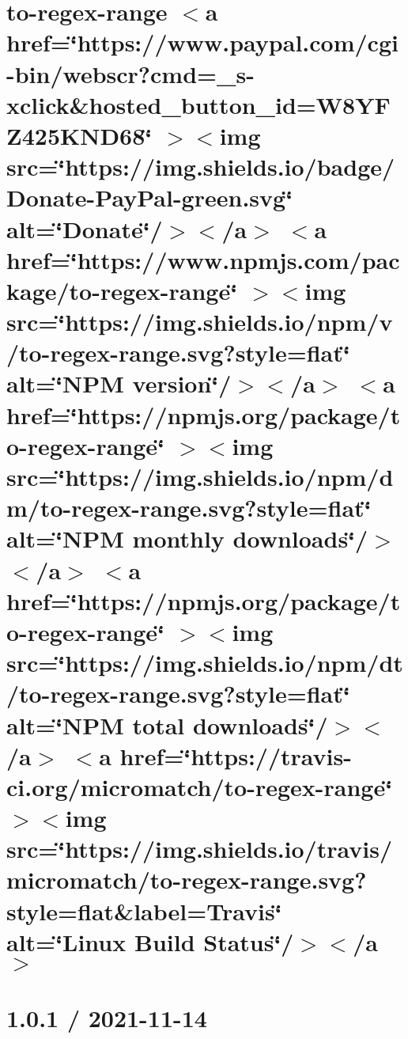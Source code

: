 \documentclass[twoside]{book}
\newcommand{\+}{\discretionary{\mbox{\scriptsize$\hookleftarrow$}}{}{}}
\begin{document}
\chapter{to-\/regex-\/range \texorpdfstring{$<$}{<}a href=\char`\"{}https\+://www.\+paypal.\+com/cgi-\/bin/webscr?cmd=\+\_\+s-\/xclick\&hosted\+\_\+button\+\_\+id=\+W8\+YFZ425\+KND68\char`\"{} \texorpdfstring{$>$}{>}\texorpdfstring{$<$}{<}img src=\char`\"{}https\+://img.\+shields.\+io/badge/\+Donate-\/\+Pay\+Pal-\/green.\+svg\char`\"{} alt=\char`\"{}\+Donate\char`\"{}/\texorpdfstring{$>$}{>}\texorpdfstring{$<$}{<}/a\texorpdfstring{$>$}{>} \texorpdfstring{$<$}{<}a href=\char`\"{}https\+://www.\+npmjs.\+com/package/to-\/regex-\/range\char`\"{} \texorpdfstring{$>$}{>}\texorpdfstring{$<$}{<}img src=\char`\"{}https\+://img.\+shields.\+io/npm/v/to-\/regex-\/range.\+svg?style=flat\char`\"{} alt=\char`\"{}\+NPM version\char`\"{}/\texorpdfstring{$>$}{>}\texorpdfstring{$<$}{<}/a\texorpdfstring{$>$}{>} \texorpdfstring{$<$}{<}a href=\char`\"{}https\+://npmjs.\+org/package/to-\/regex-\/range\char`\"{} \texorpdfstring{$>$}{>}\texorpdfstring{$<$}{<}img src=\char`\"{}https\+://img.\+shields.\+io/npm/dm/to-\/regex-\/range.\+svg?style=flat\char`\"{} alt=\char`\"{}\+NPM monthly downloads\char`\"{}/\texorpdfstring{$>$}{>}\texorpdfstring{$<$}{<}/a\texorpdfstring{$>$}{>} \texorpdfstring{$<$}{<}a href=\char`\"{}https\+://npmjs.\+org/package/to-\/regex-\/range\char`\"{} \texorpdfstring{$>$}{>}\texorpdfstring{$<$}{<}img src=\char`\"{}https\+://img.\+shields.\+io/npm/dt/to-\/regex-\/range.\+svg?style=flat\char`\"{} alt=\char`\"{}\+NPM total downloads\char`\"{}/\texorpdfstring{$>$}{>}\texorpdfstring{$<$}{<}/a\texorpdfstring{$>$}{>} \texorpdfstring{$<$}{<}a href=\char`\"{}https\+://travis-\/ci.\+org/micromatch/to-\/regex-\/range\char`\"{} \texorpdfstring{$>$}{>}\texorpdfstring{$<$}{<}img src=\char`\"{}https\+://img.\+shields.\+io/travis/micromatch/to-\/regex-\/range.\+svg?style=flat\&label=\+Travis\char`\"{} alt=\char`\"{}\+Linux Build Status\char`\"{}/\texorpdfstring{$>$}{>}\texorpdfstring{$<$}{<}/a\texorpdfstring{$>$}{>}}
\label{md__c___users_vaishnavi_jadhav__desktop__developer_code_mean_stack_example_client_node_modules_to_regex_range__r_e_a_d_m_e}

\chapter{1.0.1 / 2021-\/11-\/14}
\label{md__c___users_vaishnavi_jadhav__desktop__developer_code_mean_stack_example_client_node_modules_toidentifier__h_i_s_t_o_r_y}

\end{document}
